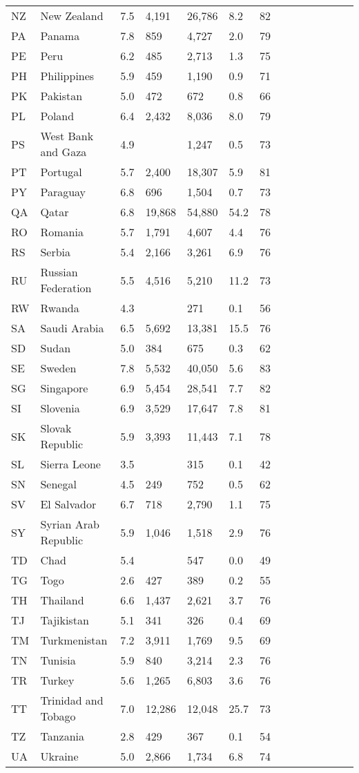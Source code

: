 \begin{scriptsize}
\begin{center}
\begin{longtable}{llllllllllllll}
NZ&New Zealand&7.5&4,191&26,786&8.2&82\\
PA&Panama&7.8&859&4,727&2.0&79\\
PE&Peru&6.2&485&2,713&1.3&75\\
PH&Philippines&5.9&459&1,190&0.9&71\\
PK&Pakistan&5.0&472&672&0.8&66\\
PL&Poland&6.4&2,432&8,036&8.0&79\\
PS&West Bank and Gaza&4.9&&1,247&0.5&73\\
PT&Portugal&5.7&2,400&18,307&5.9&81\\
PY&Paraguay&6.8&696&1,504&0.7&73\\
QA&Qatar&6.8&19,868&54,880&54.2&78\\
RO&Romania&5.7&1,791&4,607&4.4&76\\
RS&Serbia&5.4&2,166&3,261&6.9&76\\
RU&Russian Federation&5.5&4,516&5,210&11.2&73\\
RW&Rwanda&4.3&&271&0.1&56\\
SA&Saudi Arabia&6.5&5,692&13,381&15.5&76\\
SD&Sudan&5.0&384&675&0.3&62\\
SE&Sweden&7.8&5,532&40,050&5.6&83\\
SG&Singapore&6.9&5,454&28,541&7.7&82\\
SI&Slovenia&6.9&3,529&17,647&7.8&81\\
SK&Slovak Republic&5.9&3,393&11,443&7.1&78\\
SL&Sierra Leone&3.5&&315&0.1&42\\
SN&Senegal&4.5&249&752&0.5&62\\
SV&El Salvador&6.7&718&2,790&1.1&75\\
SY&Syrian Arab Republic&5.9&1,046&1,518&2.9&76\\
TD&Chad&5.4&&547&0.0&49\\
TG&Togo&2.6&427&389&0.2&55\\
TH&Thailand&6.6&1,437&2,621&3.7&76\\
TJ&Tajikistan&5.1&341&326&0.4&69\\
TM&Turkmenistan&7.2&3,911&1,769&9.5&69\\
TN&Tunisia&5.9&840&3,214&2.3&76\\
TR&Turkey&5.6&1,265&6,803&3.6&76\\
TT&Trinidad and Tobago&7.0&12,286&12,048&25.7&73\\
TZ&Tanzania&2.8&429&367&0.1&54\\
UA&Ukraine&5.0&2,866&1,734&6.8&74\\

\end{longtable}
\end{center}
\end{scriptsize}
